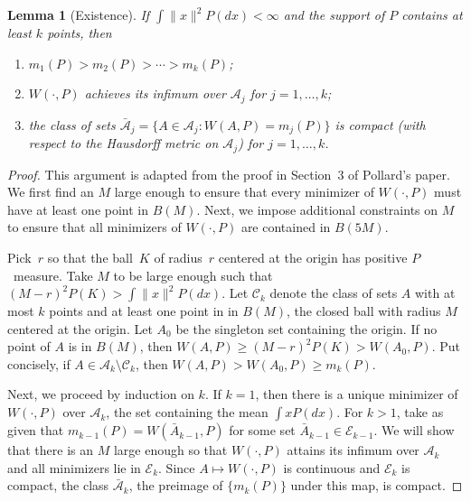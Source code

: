 \documentclass[11pt]{article}
\newtheorem{lemma}{Lemma}
\newcommand{\sA}{\mathcal{A}}
\newcommand{\sbA}{\mathcal{\bar A}}
\newcommand{\sC}{\mathcal{C}}
\newcommand{\sE}{\mathcal{E}}
\begin{document}
\begin{lemma}[Existence]\label{lem:kmeans-existence}
If $\int \|x\|^2 P(dx) < \infty$ and the support of $P$ contains at least $k$
points, then
\begin{enumerate}
  \item $m_1(P) > m_2(P) > \dotsb > m_k(P)$;
  \item $W(\cdot, P)$ achieves its infimum over $\sA_j$ for $j = 1, \dotsc,
    k$;
  \item the class of sets $\sbA_j = \{ A \in \sA_j : W(A,P) = m_{j}(P) \}$
    is compact (with respect to the Hausdorff metric on $\sA_j$) for $j = 1,
    \dotsc, k$.
\end{enumerate}
\end{lemma}
\begin{proof}
This argument is adapted from the proof in Section~3 of Pollard's paper.  We
first find an $M$ large enough to ensure that every minimizer of $W(\cdot, P)$
must have at least one point in $B(M)$.  Next, we impose additional
constraints on $M$ to ensure that all minimizers of $W(\cdot, P)$ are
contained in $B(5M)$.


Pick~$r$ so that the ball~$K$ of radius~$r$ centered at the origin has
positive $P$~measure.  Take $M$ to be large enough such that
\(
  (M - r)^2 P(K) > \int \|x\|^2 P(dx).
\)
Let $\sC_k$ denote the class of sets $A$ with at most $k$ points and at least
one point in in $B(M)$, the closed ball with radius $M$ centered at the
origin.  Let $A_0$ be the singleton set containing the origin.  If no point of
$A$ is in $B(M)$, then
\(
  W(A, P) \geq (M - r)^2 P(K) > W(A_0, P).
\)
Put concisely, if $A \in \sA_k \setminus \sC_k$, then
\(
  W(A, P) > W(A_0, P) \geq m_k(P).
\)


Next, we proceed by induction on $k$.  If $k = 1$, then there is a unique
minimizer of $W(\cdot, P)$ over $\sA_k$, the set containing the mean $\int x
P(dx)$.  For $k > 1$, take as given that $m_{k-1}(P) = W(\bar A_{k-1}, P)$ for
some set $\bar A_{k-1} \in \sE_{k-1}$.  We will show that there is an $M$
large enough so that $W(\cdot, P)$ attains its infimum over $\sA_k$ and all
minimizers lie in $\sE_k$.  Since $A \mapsto W(\cdot, P)$ is continuous and
$\sE_k$ is compact, the class $\sbA_k$, the preimage of $\{ m_k(P) \}$ under
this map, is compact.



\end{proof}
\end{document}
